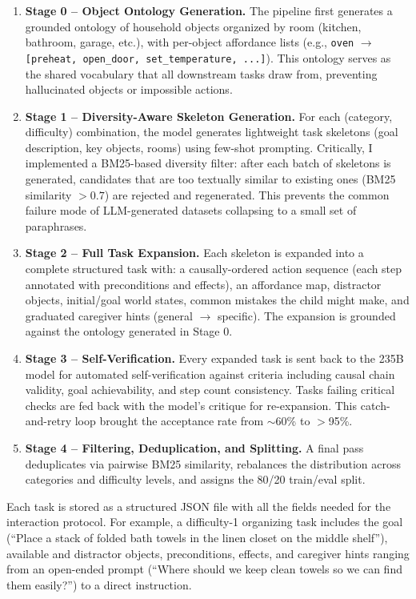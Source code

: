 \documentclass[11pt]{article}
\begin{document}
\begin{enumerate}
    \item \textbf{Stage 0 -- Object Ontology Generation.} The pipeline first generates a grounded ontology of household objects organized by room (kitchen, bathroom, garage, etc.), with per-object affordance lists (e.g., \texttt{oven} $\to$ \texttt{[preheat, open\_door, set\_temperature, ...]}). This ontology serves as the shared vocabulary that all downstream tasks draw from, preventing hallucinated objects or impossible actions.

    \item \textbf{Stage 1 -- Diversity-Aware Skeleton Generation.} For each (category, difficulty) combination, the model generates lightweight task skeletons (goal description, key objects, rooms) using few-shot prompting. Critically, I implemented a BM25-based diversity filter: after each batch of skeletons is generated, candidates that are too textually similar to existing ones (BM25 similarity $> 0.7$) are rejected and regenerated. This prevents the common failure mode of LLM-generated datasets collapsing to a small set of paraphrases.

    \item \textbf{Stage 2 -- Full Task Expansion.} Each skeleton is expanded into a complete structured task with: a causally-ordered action sequence (each step annotated with preconditions and effects), an affordance map, distractor objects, initial/goal world states, common mistakes the child might make, and graduated caregiver hints (general $\to$ specific). The expansion is grounded against the ontology generated in Stage 0.

    \item \textbf{Stage 3 -- Self-Verification.} Every expanded task is sent back to the 235B model for automated self-verification against criteria including causal chain validity, goal achievability, and step count consistency. Tasks failing critical checks are fed back with the model's critique for re-expansion. This catch-and-retry loop brought the acceptance rate from $\sim$60\% to $>$95\%.

    \item \textbf{Stage 4 -- Filtering, Deduplication, and Splitting.} A final pass deduplicates via pairwise BM25 similarity, rebalances the distribution across categories and difficulty levels, and assigns the 80/20 train/eval split.
\end{enumerate}

Each task is stored as a structured JSON file with all the fields needed for the interaction protocol. For example, a difficulty-1 organizing task includes the goal (``Place a stack of folded bath towels in the linen closet on the middle shelf''), available and distractor objects, preconditions, effects, and caregiver hints ranging from an open-ended prompt (``Where should we keep clean towels so we can find them easily?'') to a direct instruction.
\end{document}
